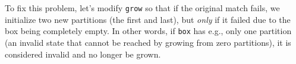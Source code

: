 To fix this problem, let's modify \texttt{grow} so that if the original match fails, we initialize two new partitions (the first and last), but \emph{only} if
it failed due to the box being completely empty. In other words, if \texttt{box} has e.g., only one partition (an invalid state that cannot be reached by
growing from zero partitions), it is considered invalid and no longer be grown.






